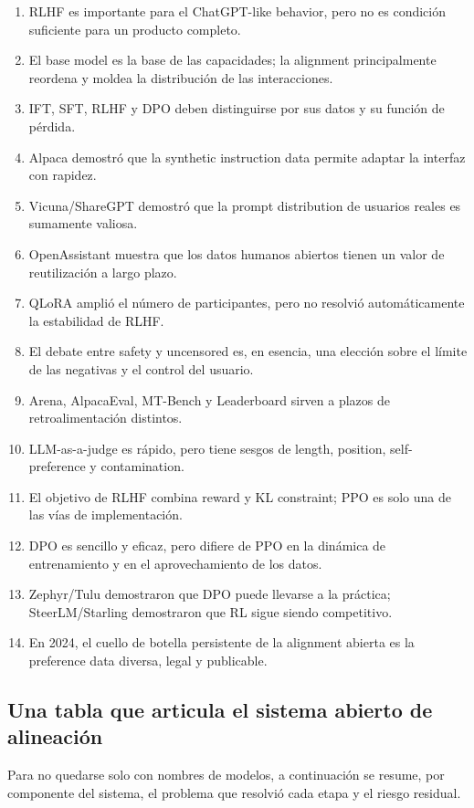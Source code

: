 \documentclass[a4paper]{article}
\begin{document}
\begin{enumerate}
  \item RLHF es importante para el ChatGPT-like behavior, pero no es condición suficiente para un producto completo.
  \item El base model es la base de las capacidades; la alignment principalmente reordena y moldea la distribución de las interacciones.
  \item IFT, SFT, RLHF y DPO deben distinguirse por sus datos y su función de pérdida.
  \item Alpaca demostró que la synthetic instruction data permite adaptar la interfaz con rapidez.
  \item Vicuna/ShareGPT demostró que la prompt distribution de usuarios reales es sumamente valiosa.
  \item OpenAssistant muestra que los datos humanos abiertos tienen un valor de reutilización a largo plazo.
  \item QLoRA amplió el número de participantes, pero no resolvió automáticamente la estabilidad de RLHF.
  \item El debate entre safety y uncensored es, en esencia, una elección sobre el límite de las negativas y el control del usuario.
  \item Arena, AlpacaEval, MT-Bench y Leaderboard sirven a plazos de retroalimentación distintos.
  \item LLM-as-a-judge es rápido, pero tiene sesgos de length, position, self-preference y contamination.
  \item El objetivo de RLHF combina reward y KL constraint; PPO es solo una de las vías de implementación.
  \item DPO es sencillo y eficaz, pero difiere de PPO en la dinámica de entrenamiento y en el aprovechamiento de los datos.
  \item Zephyr/Tulu demostraron que DPO puede llevarse a la práctica; SteerLM/Starling demostraron que RL sigue siendo competitivo.
  \item En 2024, el cuello de botella persistente de la alignment abierta es la preference data diversa, legal y publicable.
\end{enumerate}

\subsection{Una tabla que articula el sistema abierto de alineación}

Para no quedarse solo con nombres de modelos, a continuación se resume, por componente del sistema, el problema que resolvió cada etapa y el riesgo residual.
\end{document}
